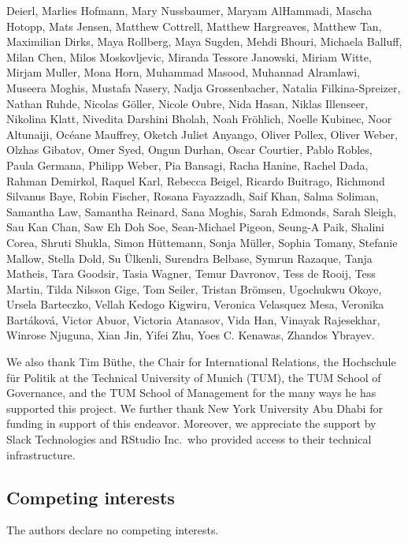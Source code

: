 \documentclass[]{article}
\begin{document}
Deierl, Marlies Hofmann, Mary Nussbaumer, Maryam AlHammadi, Mascha Hotopp, Mats Jensen, Matthew Cottrell, Matthew Hargreaves, Matthew Tan, Maximilian Dirks, Maya Rollberg, Maya Sugden, Mehdi Bhouri, Michaela Balluff, Milan Chen, Milos Moskovljevic, Miranda Tessore Janowski, Miriam Witte, Mirjam Muller, Mona Horn, Muhammad Masood, Muhannad Alramlawi, Museera Moghis, Mustafa Nasery, Nadja Grossenbacher, Natalia Filkina-Spreizer, Nathan Ruhde, Nicolas Göller, Nicole Oubre, Nida Hasan, Niklas Illenseer, Nikolina Klatt, Nivedita Darshini Bholah, Noah Fröhlich, Noelle Kubinec, Noor Altunaiji, Océane Mauffrey, Oketch Juliet Anyango, Oliver Pollex, Oliver Weber, Olzhas Gibatov, Omer Syed, Ongun Durhan, Oscar Courtier, Pablo Robles, Paula Germana, Philipp Weber, Pia Bansagi, Racha Hanine, Rachel Dada, Rahman Demirkol, Raquel Karl, Rebecca Beigel, Ricardo Buitrago, Richmond Silvanus Baye, Robin Fischer, Rosana Fayazzadh, Saif Khan, Salma Soliman, Samantha Law, Samantha Reinard, Sana Moghis, Sarah Edmonds, Sarah Sleigh, Sau Kan Chan, Saw Eh Doh Soe, Sean-Michael Pigeon, Seung-A Paik, Shalini Corea, Shruti Shukla, Simon Hüttemann, Sonja Müller, Sophia Tomany, Stefanie Mallow, Stella Dold, Su Ülkenli, Surendra Belbase, Symrun Razaque, Tanja Matheis, Tara Goodsir, Tasia Wagner, Temur Davronov, Tess de Rooij, Tess Martin, Tilda Nilsson Gige, Tom Seiler, Tristan Brömsen, Ugochukwu Okoye, Ursela Barteczko, Vellah Kedogo Kigwiru, Veronica Velasquez Mesa, Veronika Bartáková, Victor Abuor, Victoria Atanasov, Vida Han, Vinayak Rajesekhar, Winrose Njuguna, Xian Jin, Yifei Zhu, Yoes C. Kenawas, Zhandos Ybrayev.

We also thank Tim Büthe, the Chair for International Relations, the Hochschule für Politik at the Technical University of Munich (TUM), the TUM School of Governance, and the TUM School of Management for the many ways he has supported this project. We further thank New York University Abu Dhabi for funding in support of this endeavor. Moreover, we appreciate the support by Slack Technologies and RStudio Inc.~who provided access to their technical infrastructure.

\hypertarget{competing-interests}{%
\subsection*{Competing interests}\label{competing-interests}}

The authors declare no competing interests.
\end{document}
